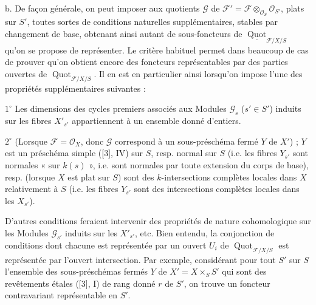 \medskip
\noindent b. De façon générale, on peut imposer aux quotients $\mathcal G$ de
$\mathcal F'=\mathcal F\otimes_{\mathcal O_S}\mathcal O_{S'}$, plats sur $S'$,
toutes sortes de conditions naturelles supplémentaires, stables par changement
de base, obtenant ainsi autant de sous-foncteurs de
$\underline{\operatorname{Quot}}_{\mathcal F/X/S}$ qu'on se propose de
représenter. Le critère habituel permet dans beaucoup de cas de prouver qu'on
obtient encore des foncteurs représentables par des parties ouvertes de
$\operatorname{Quot}_{\mathcal F/X/S}$. Il en est en particulier ainsi
lorsqu'on impose l'une des propriétés supplémentaires suivantes :

\smallskip
\noindent $1^\circ$ Les dimensions des cycles premiers associés aux Modules
$\mathcal G_s$ ($s'\in S'$) induits sur les fibres $X'_{s'}$ appartiennent
à un ensemble donné d'entiers.

\smallskip
\noindent $2^\circ$ (Lorsque $\mathcal F=\mathcal O_X$, donc $\mathcal G$
correspond à un sous-préschéma fermé $Y$ de $X'$) ; $Y$ est un préschéma simple
([3], IV) sur $S$, resp. normal sur $S$ (i.e. les fibres $Y_{s'}$ sont normales
« sur $k(s)$ », i.e. sont normales par toute extension du corps de base),
resp. (lorsque $X$ est plat sur $S$) sont des $k$-intersections complètes
locales dans $X$ relativement à $S$ (i.e. les fibres $Y_{s'}$ sont des
intersections complètes locales dans les $X_{s'}$).

D'autres conditions feraient intervenir des propriétés de nature
cohomologique sur les Modules $\mathcal G_{s'}$ induits sur les $X'_{s'}$,
etc. Bien entendu, la conjonction de conditions dont chacune est représentée
par un ouvert $U_i$ de $\operatorname{Quot}_{\mathcal F/X/S}$ est représentée
par l'ouvert intersection. Par exemple, considérant pour tout $S'$ sur $S$
l'ensemble des sous-préschémas fermés $Y$ de $X'=X\times_SS'$ qui sont des
revêtements étales ([3], I) de rang donné $r$ de $S'$, on trouve un foncteur
contravariant représentable en $S'$.

